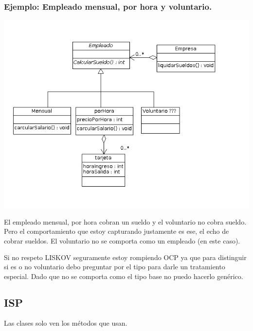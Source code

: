 \documentclass[10pt,a4paper]{article}
\begin{document}
\subsubsection{Ejemplo: Empleado mensual, por hora y voluntario.}
\includegraphics[scale=0.6]{./img/empleado-sueldo-voluntario.png}
 
El empleado mensual, por hora cobran un sueldo y el voluntario no cobra sueldo.
Pero el comportamiento que estoy capturando justamente es ese, el echo de cobrar sueldos.
El voluntario no se comporta como un empleado (en este caso).

Si no respeto LISKOV seguramente estoy rompiendo OCP
ya que para distinguir si es o no voluntario debo preguntar por el
tipo para darle un tratamiento especial. Dado que no se comporta como el tipo
base no puedo hacerlo genérico.

\subsection{ISP}
Las clases solo ven los métodos que usan.
\end{document}
